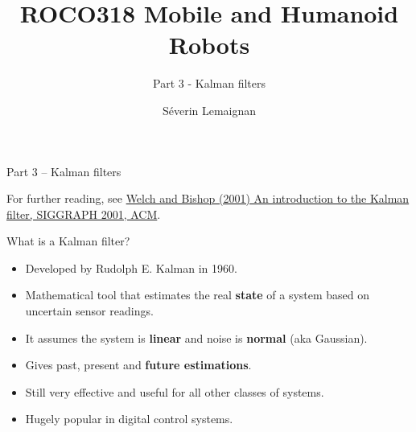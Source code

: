 \documentclass[compress]{beamer}
\title{ROCO318 \newline Mobile and Humanoid Robots}
\subtitle{Part 3 - Kalman filters}
\date{}
\author{Séverin Lemaignan}
\institute{Centre for Neural Systems and Robotics\\{\bf Plymouth University}}
\begin{document}

\maketitle

\begin{frame}{Part 3 -- Kalman filters}

    For further reading, see \href{http://www.cs.unc.edu/~welch/kalman/}{Welch and Bishop (2001) An introduction to the
    Kalman filter, SIGGRAPH 2001, ACM}.

    


\end{frame}

\begin{frame}{What is a Kalman filter?}

    \begin{itemize}
        \item Developed by Rudolph E. Kalman in 1960.
        \item Mathematical tool that estimates the real
            \textbf{state} of a system based on uncertain
            sensor readings.
        \item It assumes the system is \textbf{linear} and noise is
            \textbf{normal} (aka Gaussian).
        \item Gives past, present and \textbf{future estimations}.
        \item Still very effective and useful for all other classes of systems.
        \item Hugely popular in digital control systems.
    \end{itemize}


\end{frame}
\end{document}
